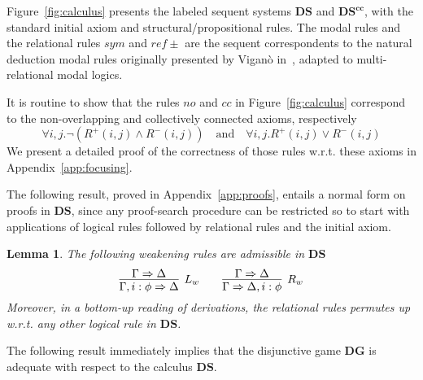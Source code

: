 \documentclass{easychair}
\newcommand{\DS}{\mathbf{DS}}
\newcommand{\seq}{\Rightarrow}
\newtheorem{lemma}{Lemma}
\newcommand{\cc}{\textbf{cc}}
\begin{document}
Figure~\ref{fig:calculus} presents the labeled sequent systems $\DS$ and $\DS^\cc$, with the standard initial axiom and structural/propositional  rules. The modal  rules and the relational rules $sym$ and  $ref\pm$  are the sequent correspondents to the natural deduction modal rules originally presented by Vigan\`{o} in~\cite{Vigano:2000}, adapted to multi-relational modal logics. 

It is routine to show that the rules $no$ and $cc$ in Figure~\ref{fig:calculus} correspond to the non-overlapping and  collectively connected axioms, respectively
\[
\forall i,j. \neg(R^+(i,j)\wedge R^-(i,j)) \quad\mbox{and}\quad \forall i,j. R^+(i,j)\vee R^-(i,j)
\]
We present a detailed proof of the correctness of those rules w.r.t. these axioms in Appendix~\ref{app:focusing}.



The following result, proved in Appendix~\ref{app:proofs}, entails a normal form on proofs in $\DS$, since any proof-search procedure can be restricted so to start with applications of logical rules followed by relational rules and the initial axiom.

\begin{lemma}\label{lemma:norm} 
The following weakening rules are admissible in $\DS$
\[
\infer[L_w]{\Gamma,i:\phi\seq\Delta}{\Gamma\seq\Delta} \qquad \infer[R_w]{\Gamma\seq\Delta,i:\phi}{\Gamma\seq\Delta}
\]
Moreover, in a bottom-up reading of derivations, the relational rules permutes up w.r.t. any other logical rule in $\DS$.
\end{lemma}

The following result immediately implies that the disjunctive game $\mathbf{DG}$ is adequate with respect to the calculus $\DS$.
\end{document}

